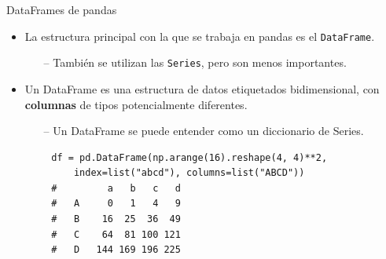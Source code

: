 \documentclass[10pt]{beamer} %
\begin{document}
\begin{frame}[fragile]{DataFrames de pandas}
     \begin{itemize}
         \item La estructura principal con la que se trabaja en pandas es el \texttt{DataFrame}.
        \begin{itemize}
            \item[--] También se utilizan las \texttt{Series}, pero son menos importantes.
        \end{itemize}
        \item Un DataFrame es una estructura de datos etiquetados bidimensional, con \textbf{columnas} de tipos potencialmente diferentes.
        \begin{itemize}
            \item[--] Un DataFrame se puede entender como un diccionario de Series.
        \end{itemize}
     \end{itemize}
     \vspace{10pt}
     \begin{verbatim}
        df = pd.DataFrame(np.arange(16).reshape(4, 4)**2,
            index=list("abcd"), columns=list("ABCD"))
        #         a   b   c   d
        #   A     0   1   4   9
        #   B    16  25  36  49
        #   C    64  81 100 121
        #   D   144 169 196 225
     \end{verbatim}
\end{frame}
\end{document}
